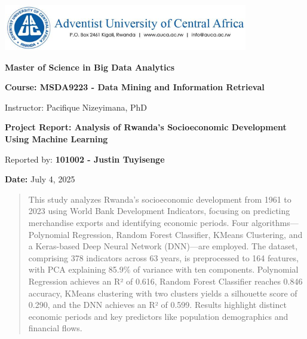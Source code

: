 \documentclass[12pt]{article}
\begin{document}
	
	\begin{titlepage}
		\centering
		\vspace*{2cm}
		\includegraphics[width=0.8\textwidth]{../figures/auca.png}\par
		\vspace{1cm}
		{\LARGE \textbf{Master of Science in Big Data Analytics}}\par
		\vspace{1.5cm}
		{\Large \textbf{Course: MSDA9223 - Data Mining and Information Retrieval}}\par
		\vspace{0.3cm}
		{\large Instructor: Pacifique Nizeyimana, PhD}\par
		\vspace{1.5cm}
		{\Large \textbf{Project Report: Analysis of Rwanda's Socioeconomic Development Using Machine Learning}}\par
		\vspace{1.5cm}
		{\large Reported by: \textbf{101002 - Justin Tuyisenge}}\par
		\vspace{2cm}
		{\large \textbf{Date:} July 4, 2025}\par
	\end{titlepage}
	
	\tableofcontents
	\clearpage
	
	\begin{abstract}
		This study analyzes Rwanda's socioeconomic development from 1961 to 2023 using World Bank Development Indicators, focusing on predicting merchandise exports and identifying economic periods. Four algorithms—Polynomial Regression, Random Forest Classifier, KMeans Clustering, and a Keras-based Deep Neural Network (DNN)—are employed. The dataset, comprising 378 indicators across 63 years, is preprocessed to 164 features, with PCA explaining 85.9\% of variance with ten components. Polynomial Regression achieves an R² of 0.616, Random Forest Classifier reaches 0.846 accuracy, KMeans clustering with two clusters yields a silhouette score of 0.290, and the DNN achieves an R² of 0.599. Results highlight distinct economic periods and key predictors like population demographics and financial flows.
	\end{abstract}
	
\end{document}
